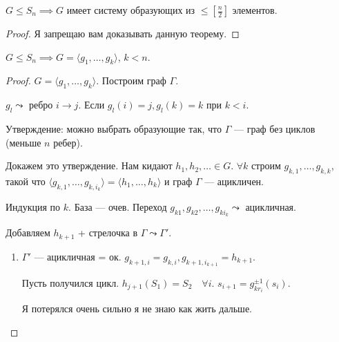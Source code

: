 \begin{theorem}
    $G \le S_n \implies G$ имеет систему образующих из $\le \left[ \frac{n}{2} \right]$ элементов. 
\end{theorem}
\begin{proof}
    Я запрещаю вам доказывать данную теорему.
\end{proof}
\begin{theorem}
    $G \le S_n \implies G = \langle g_1, \ldots, g_k \rangle$, $k < n$.
\end{theorem}
\begin{proof}
    $G = \langle g_1, \ldots, g_k\rangle$. Построим граф $\Gamma$.
     
    $g_l \leadsto$ ребро  $i \to j$. Если  $g_l(i) = j, g_l(k) = k$ при  $k < i$.
 
    Утверждение: можно выбрать образующие так, что $\Gamma$ ---  граф без циклов (меньше $n$ ребер).

    Докажем это утверждение. Нам кидают $h_1, h_2, \ldots \in G$. $\forall k$ строим  $g_{k,1}, \ldots, g_{k, k}$, такой что $\langle g_{k,1}, \ldots, g_{k, i_k} \rangle  = \langle h_1, \ldots, h_k \rangle$ и граф $\Gamma$ --- ацикличен. 

    Индукция по $k$. База --- очев. Переход  $g_{k1}, g_{k 2}, \ldots, g_{k i_k} \leadsto$ ацикличная. 

    Добавляем $h_{k+1}$ + стрелочка в  $\Gamma \leadsto \Gamma'$.
    \begin{enumerate}
        \item $\Gamma'$ --- ацикличная = ок.  $g_{k+1, i} = g_{k, i}, g_{k+1, i_{k+1}} = h_{k+1}$.

            Пусть получился цикл.  $h_{j+1}(S_1) = S_2 \quad \forall i$. $s_{i+1} = g_{kr_i}^{\pm 1}(s_i)$.

            Я потерялся очень сильно я не знаю как жить дальше.
    \end{enumerate}
\end{proof}


